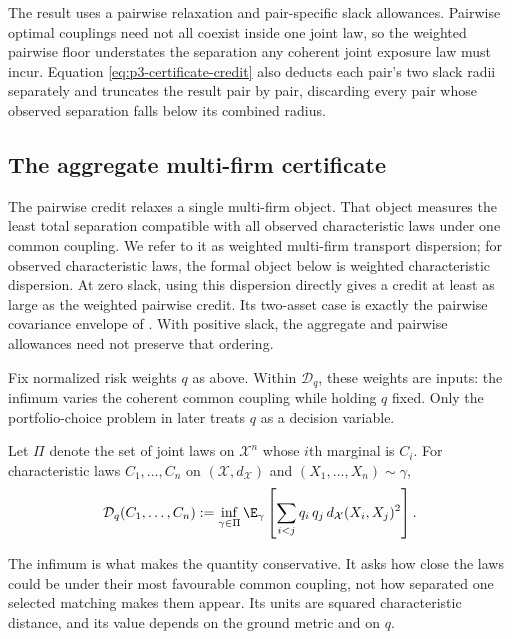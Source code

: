 The result uses a pairwise relaxation and pair-specific slack allowances.
Pairwise optimal couplings need not all coexist inside one joint law, so the
weighted pairwise floor understates the separation any coherent joint exposure
law must incur.
Equation \eqref{eq:p3-certificate-credit} also deducts each pair's two slack
radii separately and truncates the result pair by pair, discarding every pair
whose observed separation falls below its combined radius.

\subsection{The aggregate multi-firm certificate}\label{sec:sharp-certificate}

The pairwise credit relaxes a single multi-firm object.
That object measures the least total separation compatible with all observed
characteristic laws under one common coupling.
We refer to it as weighted multi-firm transport dispersion; for observed
characteristic laws, the formal object below is weighted characteristic
dispersion.
At zero slack, using this dispersion directly gives a credit at least as large
as the weighted pairwise credit.
Its two-asset case is exactly the pairwise covariance envelope of
\citet{gawronsky_continuous_2026}.
With positive slack, the aggregate and pairwise allowances need not preserve
that ordering.

Fix normalized risk weights $q$ as above.
Within $\mathcal D_q$, these weights are inputs: the infimum varies the coherent
common coupling while holding $q$ fixed.
Only the portfolio-choice problem in  later treats
$q$ as a decision variable.

\begin{definition}
  \label{def:p3-dispersion}
  Let $\Pi$ denote the set of joint laws on $\mathcal X^n$ whose $i$th marginal
  is $C_i$. For characteristic laws $C_1,\dots,C_n$ on
  $(\mathcal X,d_{\mathcal X})$ and $(X_1,\dots,X_n)\sim\gamma$,
  \begin{equation}\label{eq:p3-dispersion}
    \mathcal D_q(C_1,\dots,C_n)
    :=\inf_{\gamma\in\Pi}
    \E_\gamma\left[\sum_{i<j}q_i\,q_j\,d_{\mathcal X}(X_i,X_j)^2\right].
  \end{equation}
\end{definition}

The infimum is what makes the quantity conservative. It asks how close the
laws could be under their most favourable common coupling, not how separated
one selected matching makes them appear. Its units are squared characteristic
distance, and its value depends on the ground metric and on $q$.

